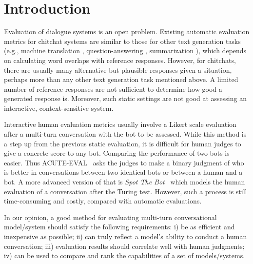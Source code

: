 \section{Introduction}
\label{sec:intro}

Evaluation of dialogue systems is an open problem. Existing
automatic evaluation metrics for chitchat systems are similar to those for 
other text generation tasks (e.g., machine translation \citep{papineni-etal-2002-bleu}, question-answering \citep{rajpurkar-etal-2016-squad}, 
summarization \citep{lin-2004-rouge}), which depends on calculating word 
overlaps with reference responses. 
However, for chitchats, there are usually 
many alternative but plausible responses given a situation, 
perhaps more than any other text generation task mentioned above. 
A limited number of reference responses are 
not sufficient to determine how good a generated response is. 
Moreover, such static settings are not good at
assessing an interactive, context-sensitive system.

Interactive human evaluation metrics usually 
involve a Likert scale evaluation after a multi-turn conversation 
with the bot to be assessed. 
While this method is a step up from the previous static evaluation, 
it is difficult for human judges to give a concrete score to
any bot.
Comparing the performance of two bots is easier. 
Thus ACUTE-EVAL~\citep{DBLP:journals/corr/abs-1909-03087} asks the 
judges to make a binary judgment of who is better in conversations between two identical bots 
or between a human and a bot. A more advanced version of that
is \textit{Spot The Bot}~\cite{deriu-etal-2020-spot} which models the 
human evaluation of a 
conversation after the Turing test. However, such a process is still 
time-consuming and costly, compared with automatic evaluations.

In our opinion, a good method for evaluating multi-turn 
conversational model/system 
should satisfy the following requirements:
i) be as efficient and inexpensive as possible;
ii) can truly reflect a model's ability to conduct a human conversation; 
iii) evaluation results should correlate well with human judgments;
iv) can be used to compare and rank the capabilities of a set of models/systems.
  

